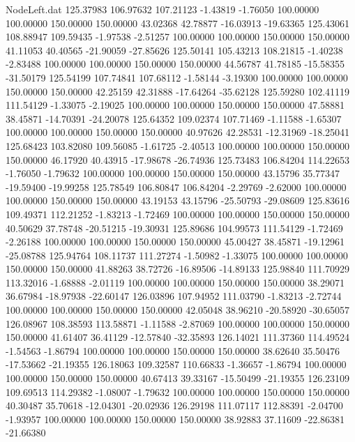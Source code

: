 \begin{filecontents}{NodeLeft.dat}
 125.37983  106.97632  107.21123    -1.43819   -1.76050  100.00000  100.00000  150.00000  150.00000   43.02368   42.78877  -16.03913  -19.63365
 125.43061  108.88947  109.59435    -1.97538   -2.51257  100.00000  100.00000  150.00000  150.00000   41.11053   40.40565  -21.90059  -27.85626
 125.50141  105.43213  108.21815    -1.40238   -2.83488  100.00000  100.00000  150.00000  150.00000   44.56787   41.78185  -15.58355  -31.50179
 125.54199  107.74841  107.68112    -1.58144   -3.19300  100.00000  100.00000  150.00000  150.00000   42.25159   42.31888  -17.64264  -35.62128
 125.59280  102.41119  111.54129    -1.33075   -2.19025  100.00000  100.00000  150.00000  150.00000   47.58881   38.45871  -14.70391  -24.20078
 125.64352  109.02374  107.71469    -1.11588   -1.65307  100.00000  100.00000  150.00000  150.00000   40.97626   42.28531  -12.31969  -18.25041
 125.68423  103.82080  109.56085    -1.61725   -2.40513  100.00000  100.00000  150.00000  150.00000   46.17920   40.43915  -17.98678  -26.74936
 125.73483  106.84204  114.22653    -1.76050   -1.79632  100.00000  100.00000  150.00000  150.00000   43.15796   35.77347  -19.59400  -19.99258
 125.78549  106.80847  106.84204    -2.29769   -2.62000  100.00000  100.00000  150.00000  150.00000   43.19153   43.15796  -25.50793  -29.08609
 125.83616  109.49371  112.21252    -1.83213   -1.72469  100.00000  100.00000  150.00000  150.00000   40.50629   37.78748  -20.51215  -19.30931
 125.89686  104.99573  111.54129    -1.72469   -2.26188  100.00000  100.00000  150.00000  150.00000   45.00427   38.45871  -19.12961  -25.08788
 125.94764  108.11737  111.27274    -1.50982   -1.33075  100.00000  100.00000  150.00000  150.00000   41.88263   38.72726  -16.89506  -14.89133
 125.98840  111.70929  113.32016    -1.68888   -2.01119  100.00000  100.00000  150.00000  150.00000   38.29071   36.67984  -18.97938  -22.60147
 126.03896  107.94952  111.03790    -1.83213   -2.72744  100.00000  100.00000  150.00000  150.00000   42.05048   38.96210  -20.58920  -30.65057
 126.08967  108.38593  113.58871    -1.11588   -2.87069  100.00000  100.00000  150.00000  150.00000   41.61407   36.41129  -12.57840  -32.35893
 126.14021  111.37360  114.49524    -1.54563   -1.86794  100.00000  100.00000  150.00000  150.00000   38.62640   35.50476  -17.53662  -21.19355
 126.18063  109.32587  110.66833    -1.36657   -1.86794  100.00000  100.00000  150.00000  150.00000   40.67413   39.33167  -15.50499  -21.19355
 126.23109  109.69513  114.29382    -1.08007   -1.79632  100.00000  100.00000  150.00000  150.00000   40.30487   35.70618  -12.04301  -20.02936
 126.29198  111.07117  112.88391    -2.04700   -1.93957  100.00000  100.00000  150.00000  150.00000   38.92883   37.11609  -22.86381  -21.66380

\end{filecontents}
